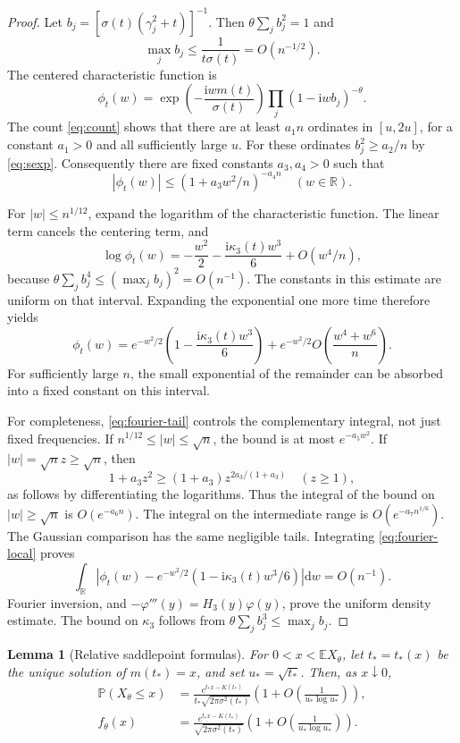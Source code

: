 \documentclass[11pt]{article}
\newtheorem{lemma}[theorem]{Lemma}
\theoremstyle{remark}\newtheorem{remark}[theorem]{Remark}
\newcommand{\E}{\mathbb E}
\newcommand{\Prob}{\mathbb P}
\newcommand{\R}{\mathbb R}
\newcommand{\ii}{\mathrm i}
\newcommand{\dd}{\mathrm d}
\begin{document}
\begin{proof}
Let $b_j=[\sigma(t)(\gamma_j^2+t)]^{-1}$. Then
$\theta\sum_jb_j^2=1$ and
\[
 \max_jb_j\leq\frac1{t\sigma(t)}=O(n^{-1/2}).
\]
The centered characteristic function is
\[
 \phi_t(w)=\exp\!\left(-\frac{\ii wm(t)}{\sigma(t)}\right)
            \prod_j(1-\ii wb_j)^{-\theta}.
\]
The count \eqref{eq:count} shows that there are at least $a_1 n$ ordinates
in $[u,2u]$, for a constant $a_1>0$ and all sufficiently large $u$.
For these ordinates $b_j^2\geq a_2/n$ by \eqref{eq:sexp}. Consequently
there are fixed constants $a_3,a_4>0$ such that
\begin{equation}\label{eq:fourier-tail}
 |\phi_t(w)|\leq(1+a_3w^2/n)^{-a_4 n}
 \quad(w\in\R).
\end{equation}

For $|w|\leq n^{1/12}$, expand the logarithm of the characteristic
function. The linear term cancels the centering term, and
\[
 \log\phi_t(w)=-\frac{w^2}{2}
                -\frac{\ii\kappa_3(t)w^3}{6}
                +O(w^4/n),
\]
because
$\theta\sum_jb_j^4\leq(\max_jb_j)^2=O(n^{-1})$.
The constants in this estimate are uniform on that interval. Expanding
the exponential one more time therefore yields
\begin{equation}\label{eq:fourier-local}
 \phi_t(w)=e^{-w^2/2}
          \left(1-\frac{\ii\kappa_3(t)w^3}{6}\right)
          +e^{-w^2/2}O\!\left(\frac{w^4+w^6}{n}\right).
\end{equation}
For sufficiently large $n$, the small exponential of the remainder can
be absorbed into a fixed constant on this interval.

For completeness, \eqref{eq:fourier-tail} controls the complementary
integral, not just fixed frequencies. If
$n^{1/12}\leq |w|\leq\sqrt n$, the bound is at most $e^{-a_5w^2}$.
If $|w|=\sqrt n z\geq\sqrt n$, then
\[
 1+a_3z^2\geq(1+a_3)z^{2a_3/(1+a_3)}\quad(z\geq1),
\]
as follows by differentiating the logarithms. Thus the integral of the
bound on $|w|\geq\sqrt n$ is $O(e^{-a_6 n})$. The integral on the
intermediate range is $O(e^{-a_7n^{1/6}})$. The Gaussian comparison has
the same negligible tails. Integrating \eqref{eq:fourier-local} proves
\[
 \int_\R\left|
  \phi_t(w)-e^{-w^2/2}(1-\ii\kappa_3(t)w^3/6)
 \right|\dd w=O(n^{-1}).
\]
Fourier inversion, and
$-\varphi'''(y)=H_3(y)\varphi(y)$, prove the uniform density estimate.
The bound on $\kappa_3$ follows from
$\theta\sum_jb_j^3\leq\max_jb_j$.
\end{proof}

\begin{lemma}[Relative saddlepoint formulas]\label{lem:saddle}
For $0<x<\E X_\theta$, let $t_*=t_*(x)$ be the unique solution of
$m(t_*)=x$, and set $u_*=\sqrt{t_*}$. Then, as $x\downarrow0$,
\begin{align}
 \Prob(X_\theta\leq x)
 &=\frac{e^{t_*x-K(t_*)}}{
          t_*\sqrt{2\pi\sigma^2(t_*)}}
     \left(1+O\!\left(\frac1{u_*\log u_*}\right)\right),
     \label{eq:implicit-cdf}\\
 f_\theta(x)
 &=\frac{e^{t_*x-K(t_*)}}{
          \sqrt{2\pi\sigma^2(t_*)}}
     \left(1+O\!\left(\frac1{u_*\log u_*}\right)\right).
     \label{eq:implicit-density}
\end{align}
\end{lemma}
\end{document}
